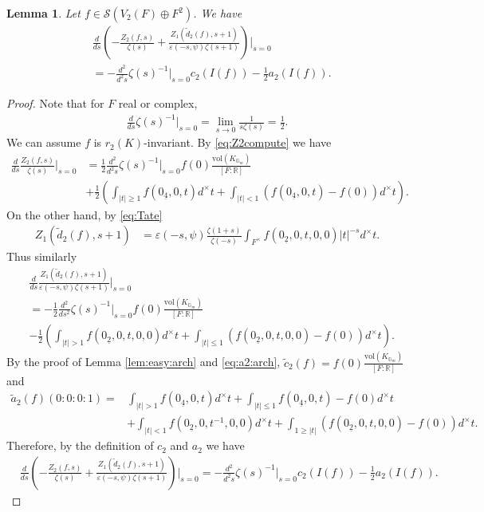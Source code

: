 \documentclass[11pt,a4paper,reqno]{amsart}
\newtheorem{lem}[thm]{Lemma}
\theoremstyle{remark}
\numberwithin{equation}{section}
\newcommand{\RR}{\mathbb{R}}
\newcommand{\GG}{\mathbb{G}}
\theoremstyle{definition}
\numberwithin{equation}{section}
\begin{document}
\begin{lem}\label{lem:der:arch}
Let $f\in \mathcal{S}(V_2(F)\oplus F^2)$. We have 
\begin{align*}
    &\frac{d}{ds} \left(-\frac{Z_{2}(f,s)}{\zeta(s)}+\frac{Z_{1}(\tilde{d}_2(f), s+1)}{\varepsilon(-s,\psi)\zeta(s+1)}\right)\Bigg|_{s=0}\\
    &=-\frac{d^2}{d^2s}\zeta(s)^{-1}\bigg|_{s=0}c_2(I(f))-\frac{1}{2}a_2(I(f)).
\end{align*}
\end{lem}

\begin{proof}
Note that for $F$ real or complex,
\begin{align*}
    \frac{d}{ds}\zeta(s)^{-1}\bigg|_{s=0}=\lim_{s\to 0} \frac{1}{s\zeta(s)}=\frac{1}{2}.
\end{align*}
We can assume $f$ is $r_2(K)$-invariant. By \eqref{eq:Z2compute}  we have
    \begin{align*}
        \frac{d}{ds}\frac{Z_2(f,s)}{\zeta(s)}\bigg|_{s=0}&=\frac{1}{2}\frac{d^2}{d^2s}\zeta(s)^{-1}\bigg|_{s=0}f(0)\frac{\mathrm{vol}(K_{\GG_m})}{[F:\RR]}\\
        &+\frac{1}{2}\left(\int_{|t|\ge1} f(0_{\underline{4}},0,t) d^\times t+\int_{|t|<1} (f(0_{\underline{4}},0,t)-f(0)) d^\times t\right).
    \end{align*}
    On the other hand, by \eqref{eq:Tate}
    \begin{align*}
 Z_1(\tilde{d}_2(f),s+1)&=\varepsilon(-s,\psi)\frac{\zeta(1+s)}{\zeta(-s)}\int_{F^\times} f(0_{\underline{2}},0,t,0,0)|t|^{-s}d^\times t.
    \end{align*}
    Thus similarly
    \begin{align*}
        &\frac{d}{ds} \frac{Z_1(\tilde{d}_2(f),s+1)}{\varepsilon(-s,\psi)\zeta(s+1)}\Bigg|_{s=0}\\
        &=-\frac{1}{2}\frac{d^2}{ds^2}{\zeta(s)}^{-1}\bigg|_{s=0}f(0)\frac{\mathrm{vol}(K_{\GG_m})}{[F:\RR]}\\
        &-\frac{1}{2}\left(\int_{|t|>1} f(0_{\underline{2}},0,t,0,0)d^\times t+\int_{|t|\le 1} (f(0_{\underline{2}},0,t,0,0)-f(0))d^\times t\right).
    \end{align*}
By the proof of Lemma \ref{lem:easy:arch} and \eqref{eq:a2:arch}, $\tilde{c}_2(f)=f(0)\frac{\mathrm{vol}(K_{\GG_m})}{[F:\RR]}$ and
\begin{align*}
    \tilde{a}_2(f)(0:0:0:1)=&\int_{|t|>1} f(0_{\underline{4}},0,t)d^\times t+ \int_{|t|\le 1} f(0_{\underline{4}},0,t)-f(0)d^\times t\\
    &+  \int_{|t|< 1} f(0_{\underline{2}},0,t^{-1},0,0)d^\times t+\int_{1\ge |t|} (f(0_{\underline{2}},0,t,0,0)-f(0))d^\times t.
\end{align*}
Therefore, by the definition of $c_2$ and $a_2$ we have
\begin{align*}
    &\frac{d}{ds} \left(-\frac{Z_{2}(f,s)}{\zeta(s)}+\frac{Z_{1}(\tilde{d}_2(f), s+1)}{\varepsilon(-s,\psi)\zeta(s+1)}\right)\Bigg|_{s=0}=-\frac{d^2}{d^2s}\zeta(s)^{-1}\bigg|_{s=0}c_2(I(f))-\frac{1}{2}a_2(I(f)).
\end{align*}
\end{proof}
\end{document}

